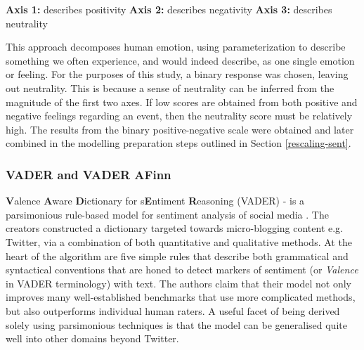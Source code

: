 \documentclass{article}
\begin{document}
\begin{center}
   \begin{minipage}[c]{65mm} 
   \raggedright %
      \textbf{Axis 1:} describes positivity \newline
      \textbf{Axis 2:} describes negativity \newline
      \textbf{Axis 3:} describes neutrality \newline
  \end{minipage}
\end{center}

\vspace{-3mm}

This approach decomposes human emotion, using parameterization to describe something we often experience, and would indeed describe, as one single emotion or feeling. For the purposes of this study, a binary response was chosen, leaving out neutrality. This is because a sense of neutrality can be inferred from the magnitude of the first two axes. If low scores are obtained from both positive and negative feelings regarding an event, then the neutrality score must be relatively high. The results from the binary positive-negative scale were obtained and later combined in the modelling preparation steps outlined in Section \ref{rescaling-sent}.


\subsubsection{VADER and VADER AFinn \label{vader}}
\label{sec-4-4-4}

\textbf{V}alence \textbf{A}ware \textbf{D}ictionary for s\textbf{E}ntiment \textbf{R}easoning (VADER) - is a parsimonious rule-based model for sentiment analysis of social media \cite{hutto2014vader}. The creators constructed a dictionary targeted towards micro-blogging content e.g. Twitter, via a combination of both quantitative and qualitative methods. At the heart of the algorithm are five simple rules that describe both grammatical and syntactical conventions that are honed to detect markers of sentiment (or \emph{Valence} in VADER terminology) with text. The authors claim that their model not only improves many well-established benchmarks that use more complicated methods, but also outperforms individual human raters. A useful facet of being derived solely using parsimonious techniques is that the model can be generalised quite well into other domains beyond Twitter.
\end{document}
